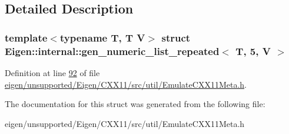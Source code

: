 \subsection{Detailed Description}
\subsubsection*{template$<$typename T, T V$>$\newline
struct Eigen\+::internal\+::gen\+\_\+numeric\+\_\+list\+\_\+repeated$<$ T, 5, V $>$}



Definition at line \hyperlink{eigen_2unsupported_2_eigen_2_c_x_x11_2src_2util_2_emulate_c_x_x11_meta_8h_source_l00092}{92} of file \hyperlink{eigen_2unsupported_2_eigen_2_c_x_x11_2src_2util_2_emulate_c_x_x11_meta_8h_source}{eigen/unsupported/\+Eigen/\+C\+X\+X11/src/util/\+Emulate\+C\+X\+X11\+Meta.\+h}.



The documentation for this struct was generated from the following file\+:\begin{DoxyCompactItemize}
\item 
eigen/unsupported/\+Eigen/\+C\+X\+X11/src/util/\+Emulate\+C\+X\+X11\+Meta.\+h\end{DoxyCompactItemize}
